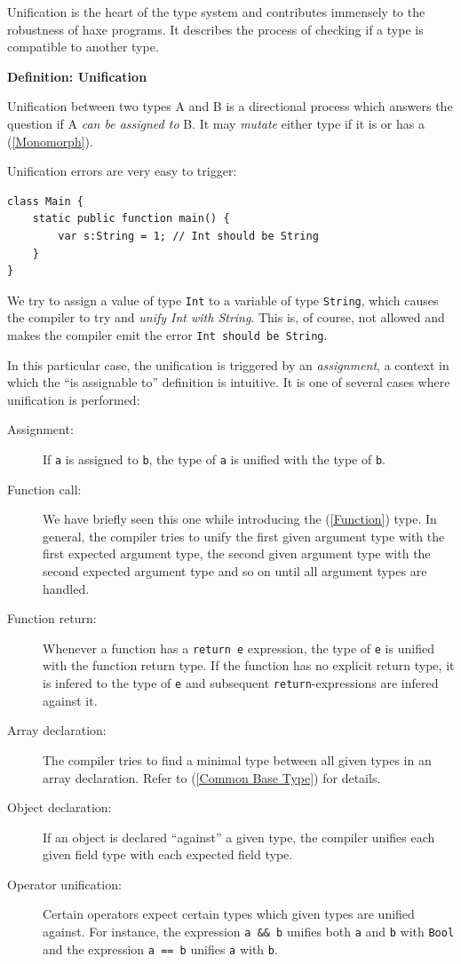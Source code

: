 \documentclass{article}
\newcommand{\type}[1]{\texttt{#1}}
\newcommand{\expr}[1]{\texttt{#1}}
\newenvironment{myshaded}
  {\def\FrameCommand{\fboxsep=\topsep\colorbox{bgcolor}}%
  \MakeFramed {\advance\hsize-\width \FrameRestore}}%
 {\endMakeFramed}
\newcommand{\define}[3][Definition]
	{\begin{myshaded}\noindent\textbf{#1: #2}\par\nobreak\noindent\ignorespaces#3\label{def:#2}\end{myshaded}}
\newcommand{\fullref}[1]{\nameref{#1} (\cref{#1})}
\begin{document}
Unification is the heart of the type system and contributes immensely to the robustness of haxe programs. It describes the process of checking if a type is compatible to another type.

\define{Unification}{Unification between two types A and B is a directional process which answers the question if A \emph{can be assigned to} B. It may \emph{mutate} either type if it is or has a \fullref{Monomorph}.}

Unification errors are very easy to trigger:

\begin{lstlisting}
class Main {
	static public function main() {
		var s:String = 1; // Int should be String
	}
}
\end{lstlisting}
We try to assign a value of type \type{Int} to a variable of type \type{String}, which causes the compiler to try and \emph{unify Int with String}. This is, of course, not allowed and makes the compiler emit the error \expr{Int should be String}.

In this particular case, the unification is triggered by an \emph{assignment}, a context in which the ``is assignable to'' definition is intuitive. It is one of several cases where unification is performed:

\begin{description}
	\item[Assignment:] If \expr{a} is assigned to \expr{b}, the type of \expr{a} is unified with the type of \expr{b}.
	\item[Function call:] We have briefly seen this one while introducing the \fullref{Function} type. In general, the compiler tries to unify the first given argument type with the first expected argument type, the second given argument type with the second expected argument type and so on until all argument types are handled.
	\item[Function return:] Whenever a function has a \expr{return e} expression, the type of \expr{e} is unified with the function return type. If the function has no explicit return type, it is infered to the type of \expr{e} and subsequent \expr{return}-expressions are infered against it.
	\item[Array declaration:] The compiler tries to find a minimal type between all given types in an array declaration. Refer to \fullref{Common Base Type} for details.
	\item[Object declaration:] If an object is declared ``against'' a given type, the compiler unifies each given field type with each expected field type.
	\item[Operator unification:] Certain operators expect certain types which given types are unified against. For instance, the expression \expr{a \&\& b} unifies both \expr{a} and \expr{b} with \type{Bool} and the expression \expr{a == b} unifies \expr{a} with \expr{b}.
\end{description}
\end{document}
